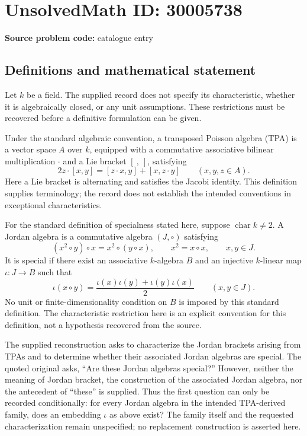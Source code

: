 \documentclass[11pt]{article}
\begin{document}
\section*{UnsolvedMath ID: 30005738}
\textbf{Source problem code:} catalogue entry
\subsection{Definitions and mathematical statement}
Let \(k\) be a field. The supplied record does not specify its characteristic, whether it is algebraically closed, or any unit assumptions. These restrictions must be recovered before a definitive formulation can be given.

Under the standard algebraic convention, a transposed Poisson algebra (TPA) is a vector space \(A\) over \(k\), equipped with a commutative associative bilinear multiplication \(\cdot\) and a Lie bracket \([\ ,\ ]\), satisfying
\[
2z\cdot[x,y]=[z\cdot x,y]+[x,z\cdot y]
\qquad(x,y,z\in A).
\]
Here a Lie bracket is alternating and satisfies the Jacobi identity. This definition supplies terminology; the record does not establish the intended conventions in exceptional characteristics.

For the standard definition of specialness stated here, suppose \(\operatorname{char}k\ne2\). A Jordan algebra is a commutative algebra \((J,\circ)\) satisfying
\[
(x^2\circ y)\circ x=x^2\circ(y\circ x),
\qquad x^2=x\circ x,
\qquad x,y\in J.
\]
It is special if there exist an associative \(k\)-algebra \(B\) and an injective \(k\)-linear map \(\iota:J\to B\) such that
\[
\iota(x\circ y)=\frac{\iota(x)\iota(y)+\iota(y)\iota(x)}{2}
\qquad(x,y\in J).
\]
No unit or finite-dimensionality condition on \(B\) is imposed by this standard definition. The characteristic restriction here is an explicit convention for this definition, not a hypothesis recovered from the source.

The supplied reconstruction asks to characterize the Jordan brackets arising from TPAs and to determine whether their associated Jordan algebras are special. The quoted original asks, ``Are these Jordan algebras special?'' However, neither the meaning of Jordan bracket, the construction of the associated Jordan algebra, nor the antecedent of ``these'' is supplied. Thus the first question can only be recorded conditionally: for every Jordan algebra in the intended TPA-derived family, does an embedding \(\iota\) as above exist? The family itself and the requested characterization remain unspecified; no replacement construction is asserted here.
\end{document}
